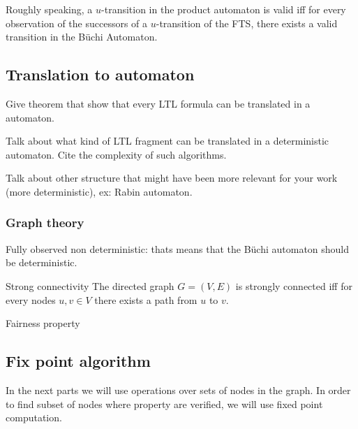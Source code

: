 Roughly speaking, a $u$-transition in the product automaton is valid iff for every observation of the successors of a $u$-transition of the FTS, there exists a valid transition in the B\"uchi Automaton.




\subsection{Translation to \buchi{} automaton}

Give theorem that show that every LTL formula can be translated in a \buchi{} automaton.

Talk about what kind of LTL fragment can be translated in a deterministic \buchi{} automaton.
Cite the complexity of such algorithms.

Talk about other structure that might have been more relevant for your work (more deterministic), ex: Rabin automaton.



\subsubsection{Graph theory}
Fully observed non deterministic: thats means that the B\"uchi automaton should be deterministic.

\begin{nameddef}{Strong connectivity}
The directed graph $G = (V,E)$ is strongly connected iff for every nodes $u,v \in V$ there exists a path from $u$ to $v$.
\end{nameddef}


\begin{nameddef}{Fairness property}

\end{nameddef}


\subsection{Fix point algorithm}

In the next parts we will use operations over sets of nodes in the graph. In order to find subset of nodes where property are verified, we will use fixed point computation.

